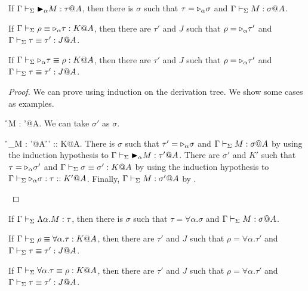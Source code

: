 \begin{lemma}
    \label{lemma:InversionLemmaForTWType}
    \begin{item}
    \item If $\G \V \TB_\alpha M : \tau@A$, then
        there is $\sigma$ such that $\tau = {\mathop{\triangleright}}_\alpha \sigma$ and $\G \V M : \sigma@A$.
    \item If $\Gamma \vdash_\Sigma \rho \equiv {\mathop{\triangleright}}_\alpha \tau : K @A$, then there are $\tau'$ and $J$ such that
        $\rho = {\mathop{\triangleright}}_\alpha \tau'$ and $\Gamma \vdash_\Sigma \tau \equiv \tau' : J @A$.
    \item If $\Gamma \vdash_\Sigma {\mathop{\triangleright}}_\alpha \tau \equiv \rho : K @A$, then there are $\tau'$ and $J$ such that
        $\rho = {\mathop{\triangleright}}_\alpha \tau'$ and $\Gamma \vdash_\Sigma \tau \equiv \tau' : J @A$.
    \end{item}
\end{lemma}

\begin{proof}
    We can prove using induction on the derivation tree.
    We show some cases as examples.

    \begin{rneqncase}{\TTB{}}{\G \V M : \sigma'@A\alpha.}
        We can take $\sigma'$ as $\sigma$.
    \end{rneqncase}
    \begin{rneqncase}{\TConv{}}{
            \G \V \TB_\alpha M : \tau'@A  \G\V\tau' \E \tau :: K@A.
            }
            There is $\sigma$ such that $\tau' = {\mathop{\triangleright}}_\alpha \sigma$ and $\G \V M : \sigma@A$
            by using the induction hypothesis to \( \Gamma \vdash_\Sigma {\mathop{\blacktriangleright}}_\alpha M : \tau' @A\).
            There are $\sigma'$ and $K'$ such that $\tau = {\mathop{\triangleright}}_\alpha \sigma'$ and $\Gamma \vdash_\Sigma \sigma \equiv \sigma' : K @ A$
            by using the induction hypothesis to \( \Gamma \vdash_\Sigma {\mathop{\triangleright}}_\alpha \sigma : \tau :: K' @A\).
            Finally, $\Gamma \vdash_\Sigma M : \sigma' @ A $ by \TConv.
    \end{rneqncase}

\end{proof}

\begin{lemma}
    \label{lemma:InversionForForallType}
    \begin{item}
    \item If $\Gamma \vdash_\Sigma \Lambda\alpha.M : \tau$, then
        there is $\sigma$ such that $\tau = \forall\alpha.\sigma$ and $\G \V M : \sigma@A$.%
    \item If $\Gamma \vdash_\Sigma \rho \equiv \forall\alpha.\tau : K @A$, then there are $\tau'$ and $J$ such that
        $\rho = \forall\alpha.\tau'$ and $\Gamma \vdash_\Sigma \tau \equiv \tau' : J @A$.
    \item If $\Gamma \vdash_\Sigma \forall\alpha.\tau \equiv \rho : K @A$, then there are $\tau'$ and $J$ such that
        $\rho = \forall\alpha.\tau'$ and $\Gamma \vdash_\Sigma \tau \equiv \tau' : J @A$.
    \end{item}
\end{lemma}

